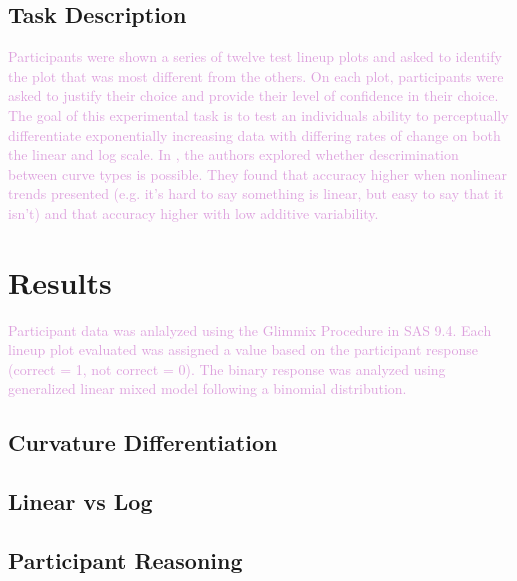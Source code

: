 \documentclass[]{interact}
\theoremstyle{plain}%
\theoremstyle{definition}
\theoremstyle{remark}
\begin{document}
\hypertarget{task-description}{%
\subsection{Task Description}\label{task-description}}

\textcolor{Plum}{Participants were shown a series of twelve test lineup plots and asked to identify the plot that was most different from the others. 
On each plot, participants were asked to justify their choice and provide their level of confidence in their choice.
The goal of this experimental task is to test an individuals ability to perceptually differentiate exponentially increasing data with differing rates of change on both the linear and log scale. 
In \cite{best_perception_2007}, the authors explored whether descrimination between curve types is possible. 
They found that accuracy higher when nonlinear trends presented (e.g. it’s hard to say something is linear, but easy to say that it isn’t) and that accuracy higher with low additive variability.
}

\hypertarget{results}{%
\section{Results}\label{results}}

\textcolor{Plum}{
Participant data was anlalyzed using the Glimmix Procedure in SAS 9.4. Each lineup plot evaluated was assigned a value based on the participant response (correct = 1, not correct = 0). The binary response was analyzed using generalized linear mixed model following a binomial distribution. 
}

\hypertarget{curvature-differentiation}{%
\subsection{Curvature Differentiation}\label{curvature-differentiation}}

\hypertarget{linear-vs-log}{%
\subsection{Linear vs Log}\label{linear-vs-log}}

\hypertarget{participant-reasoning}{%
\subsection{Participant Reasoning}\label{participant-reasoning}}
\end{document}
